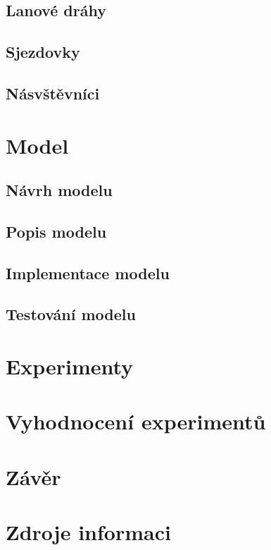 \documentclass[a4paper, 11pt]{article}\usepackage{times}
\begin{document}
\subsection{Lanové dráhy}
\subsection{Sjezdovky}
\subsection{Násvštěvníci}
\section{Model}  %

\subsection{Návrh modelu}

\subsection{Popis modelu}

\subsection{Implementace modelu}

\subsection{Testování modelu}

\section{Experimenty}

\section{Vyhodnocení experimentů} %

\section{Závěr} %

\section{Zdroje informaci}
\end{document}
